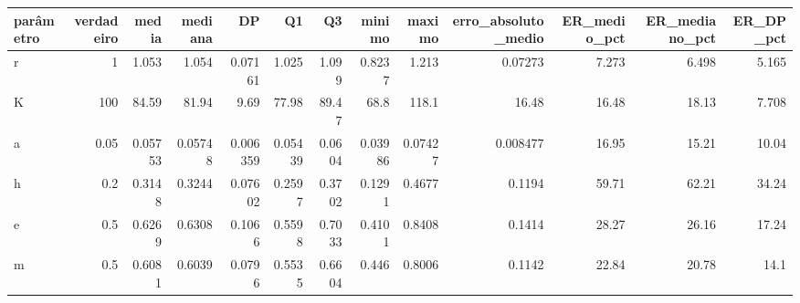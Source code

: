 \begin{tabular}{lrrrrrrrrrrrr}
\toprule
parâmetro & verdadeiro & media & mediana & DP & Q1 & Q3 & minimo & maximo & erro\_absoluto\_medio & ER\_medio\_pct & ER\_mediano\_pct & ER\_DP\_pct \\
\midrule
r & 1 & 1.053 & 1.054 & 0.07161 & 1.025 & 1.099 & 0.8237 & 1.213 & 0.07273 & 7.273 & 6.498 & 5.165 \\
K & 100 & 84.59 & 81.94 & 9.69 & 77.98 & 89.47 & 68.8 & 118.1 & 16.48 & 16.48 & 18.13 & 7.708 \\
a & 0.05 & 0.05753 & 0.05748 & 0.006359 & 0.05439 & 0.0604 & 0.03986 & 0.07427 & 0.008477 & 16.95 & 15.21 & 10.04 \\
h & 0.2 & 0.3148 & 0.3244 & 0.07602 & 0.2597 & 0.3702 & 0.1291 & 0.4677 & 0.1194 & 59.71 & 62.21 & 34.24 \\
e & 0.5 & 0.6269 & 0.6308 & 0.1066 & 0.5598 & 0.7033 & 0.4101 & 0.8408 & 0.1414 & 28.27 & 26.16 & 17.24 \\
m & 0.5 & 0.6081 & 0.6039 & 0.0796 & 0.5535 & 0.6604 & 0.446 & 0.8006 & 0.1142 & 22.84 & 20.78 & 14.1 \\
\bottomrule
\end{tabular}
